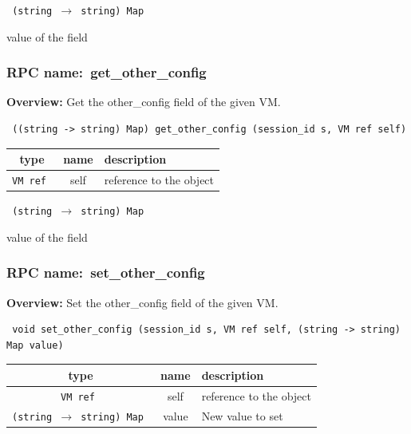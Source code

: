 \vspace{0.3cm}

{\tt 
(string $\rightarrow$ string) Map
}


value of the field
\vspace{0.3cm}
\vspace{0.3cm}
\vspace{0.3cm}
\subsubsection{RPC name:~get\_other\_config}

{\bf Overview:} 
Get the other\_config field of the given VM.

\begin{verbatim} ((string -> string) Map) get_other_config (session_id s, VM ref self)\end{verbatim}



 
\vspace{0.3cm}
\begin{tabular}{|c|c|p{7cm}|}
 \hline
{\bf type} & {\bf name} & {\bf description} \\ \hline
{\tt VM ref } & self & reference to the object \\ \hline 

\end{tabular}

\vspace{0.3cm}

{\tt 
(string $\rightarrow$ string) Map
}


value of the field
\vspace{0.3cm}
\vspace{0.3cm}
\vspace{0.3cm}
\subsubsection{RPC name:~set\_other\_config}

{\bf Overview:} 
Set the other\_config field of the given VM.

\begin{verbatim} void set_other_config (session_id s, VM ref self, (string -> string) Map value)\end{verbatim}



 
\vspace{0.3cm}
\begin{tabular}{|c|c|p{7cm}|}
 \hline
{\bf type} & {\bf name} & {\bf description} \\ \hline
{\tt VM ref } & self & reference to the object \\ \hline 

{\tt (string $\rightarrow$ string) Map } & value & New value to set \\ \hline 

\end{tabular}

